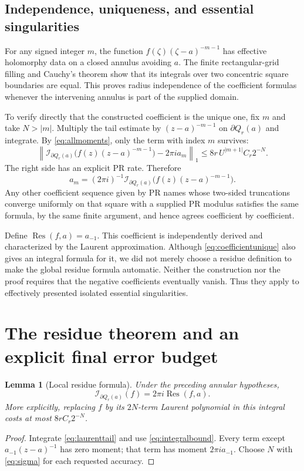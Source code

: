 \documentclass[11pt]{article}
\newtheorem{lemma}[theorem]{Lemma}
\theoremstyle{definition}
\newcommand{\norm}[1]{\left\lVert#1\right\rVert_1}
\newcommand{\Res}{\operatorname{Res}}
\newcommand{\Int}{\mathcal I}
\newcommand{\bd}{\partial}
\begin{document}
\subsection{Independence, uniqueness, and essential singularities}

For any signed integer \(m\), the function
\(f(\zeta)(\zeta-a)^{-m-1}\) has effective holomorphy data on a closed
annulus avoiding \(a\). The finite rectangular-grid filling and Cauchy's
theorem show that its integrals over two concentric square boundaries
are equal. This proves radius independence of the coefficient formulas
whenever the intervening annulus is part of the supplied domain.

To verify directly that the constructed coefficient is the unique one,
fix \(m\) and take \(N>|m|\). Multiply the tail estimate by
\((z-a)^{-m-1}\) on \(\bd Q_r(a)\) and integrate. By
\eqref{eq:allmoments}, only the term with index \(m\) survives:
\[
 \norm{\Int_{\bd Q_r(a)}
       \bigl(f(z)(z-a)^{-m-1}\bigr)-2\pi i a_m}
 \le8r\,U^{|m+1|}C_r2^{-N}.
\]
The right side has an explicit PR rate. Therefore
\begin{equation}\label{eq:coefficientunique}
 a_m=(2\pi i)^{-1}\Int_{\bd Q_r(a)}
                         \bigl(f(z)(z-a)^{-m-1}\bigr).
\end{equation}
Any other coefficient sequence given by PR names whose two-sided
truncations converge uniformly on that square with a supplied PR
modulus satisfies the same formula, by the same finite argument, and
hence agrees coefficient by coefficient.

Define \(\Res(f,a)=a_{-1}\). This coefficient is independently derived
and characterized by the Laurent approximation. Although
\eqref{eq:coefficientunique} also gives an integral formula for it,
we did not merely choose a residue definition to make the global
residue formula automatic. Neither the construction nor the proof
requires that the negative coefficients eventually vanish. Thus they
apply to effectively presented isolated essential singularities.

\section{The residue theorem and an explicit final error budget}\label{sec:residue}

\begin{lemma}[Local residue formula]\label{lem:localres}
Under the preceding annular hypotheses,
\begin{equation}\label{eq:localres}
 \Int_{\bd Q_r(a)}(f)=2\pi i\Res(f,a).
\end{equation}
More explicitly, replacing \(f\) by its \(2N\)-term Laurent polynomial
in this integral costs at most \(8rC_r2^{-N}\).
\end{lemma}
\begin{proof}
Integrate \eqref{eq:laurenttail} and use
\eqref{eq:integralbound}. Every term except \(a_{-1}(z-a)^{-1}\)
has zero moment; that term has moment \(2\pi i a_{-1}\).
Choose \(N\) with \eqref{eq:sigma} for each requested accuracy.
\end{proof}
\end{document}
